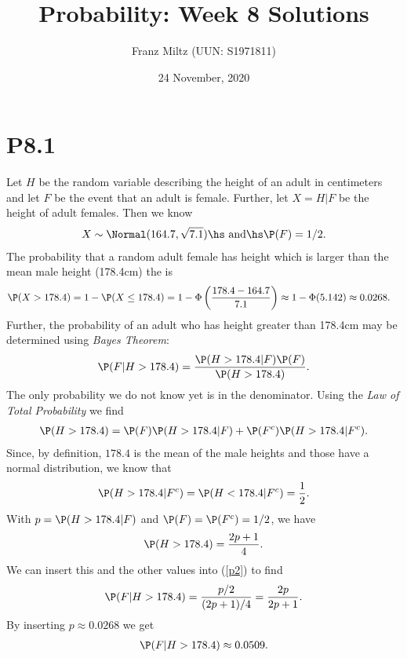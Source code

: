 \documentclass{article}
\begin{document}
\title{Probability: Week 8 Solutions}
\author{Franz Miltz (UUN: S1971811)}
\date{24 November, 2020}
\maketitle

\section*{P8.1}

Let $H$ be the random variable describing the height of an adult in centimeters
and let $F$ be the event that an adult is female. Further, let $X=H|F$ be the
height of adult females. Then we know
\begin{align*}
	X \sim \Normal(164.7, \sqrt{7.1})
	\text{\hs and\hs}
	\P(F) = 1/2.
\end{align*}
The probability that a random adult female has height which is larger than
the mean male height (178.4cm) the is
\begin{align*}
	\P(X>178.4) & = 1 - \P(X \leq 178.4) = 1 - \Phi\left(\frac{178.4-164.7}{7.1}\right)
	\approx 1-\Phi(5.142) \approx 0.0268.
\end{align*}
Further, the probability of an adult who has height greater than 178.4cm
may be determined using \emph{Bayes Theorem}:
\begin{align}
	\label{p2}
	\P(F|H>178.4) = \frac{\P(H>178.4|F)\P(F)}{\P(H>178.4)}.
\end{align}
The only probability we do not know yet is in the denominator. Using the
\emph{Law of Total Probability} we find
\begin{align*}
	\P(H>178.4) = \P(F)\P(H>178.4|F) + \P(F^c)\P(H>178.4|F^c).
\end{align*}
Since, by definition, $178.4$ is the mean of the male heights and those
have a normal distribution, we know that
\begin{align*}
	\P(H>178.4|F^c) = \P(H<178.4|F^c)=\frac{1}{2}.
\end{align*}
With $p=\P(H>178.4|F)$ and $\P(F)=\P(F^c)=1/2$, we have
\begin{align*}
	\P(H>178.4) = \frac{2p+1}{4}.
\end{align*}
We can insert this and the other values into (\ref{p2}) to find
\begin{align*}
	\P(F|H>178.4)=\frac{p/2}{(2p+1)/4}=\frac{2p}{2p+1}.
\end{align*}
By inserting $p\approx 0.0268$ we get
\begin{align*}
	\P(F|H>178.4)\approx 0.0509.
\end{align*}
\end{document}

